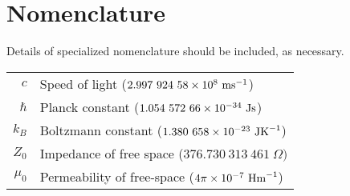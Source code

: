 \chapter*{Nomenclature} 

Details of specialized nomenclature should be included, as necessary.

\begin{longtable}{rl}
$c$ & Speed of light ($2.997\ 924\ 58 \times 10^{8}\ \mbox{ms}^{-1}$) \\
$\hbar$ & Planck constant ($1.054\ 572\ 66\times 10^{-34}\ \mbox{Js}$) \\
$k_B$ & Boltzmann constant  ($1.380\ 658\times 10^{-23}\ \mbox{JK}^{-1} $) \\
$Z_0$ &Impedance of free space  ($376.730\ 313\ 461\ \Omega) $ \\
$\mu_0$ &Permeability of free-space ($4\pi\times 10^{-7}\ \mbox{Hm}^{-1}$) \\
\end{longtable}
